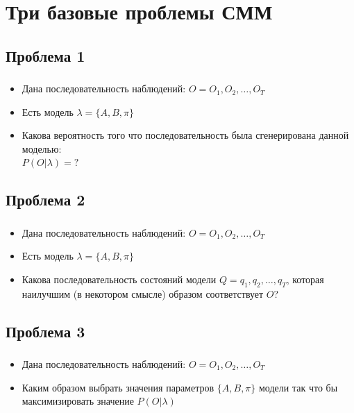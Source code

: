 \documentclass{beamer}
\begin{document}
\section{Три базовые проблемы СММ}
\subsection{Проблема 1}

\begin{frame} 
  \frametitle{\insertsection}
  \framesubtitle{\insertsubsection}
  \begin{itemize}
  \item Дана последовательность наблюдений: $O = O_1, O_2, \ldots, O_T$ \pause
  \item Есть модель $\lambda = \{A, B, \pi \}$ \pause
  \item Какова вероятность того что последовательность была сгенерирована данной моделью: \\
    $P(O | \lambda) = ?$
  \end{itemize}
\end{frame}

\subsection{Проблема 2}

\begin{frame} 
  \frametitle{\insertsection}
  \framesubtitle{\insertsubsection}
  \begin{itemize}
  \item Дана последовательность наблюдений: $O = O_1, O_2, \ldots, O_T$ \pause
  \item Есть модель $\lambda = \{A, B, \pi \}$ \pause
  \item Какова последовательность состояний модели $Q = q_1, q_2, \ldots, q_T$, которая наилучшим (в некотором смысле) образом соответствует $O$?
  \end{itemize}
\end{frame}

\subsection{Проблема 3}

\begin{frame} 
  \frametitle{\insertsection}
  \framesubtitle{\insertsubsection}
  \begin{itemize}
  \item Дана последовательность наблюдений: $O = O_1, O_2, \ldots, O_T$ \pause
  \item Каким образом выбрать значения параметров $\{A, B, \pi\}$ модели так что бы максимизировать значение $P(O|\lambda)$
  \end{itemize}
\end{frame}
\end{document}

